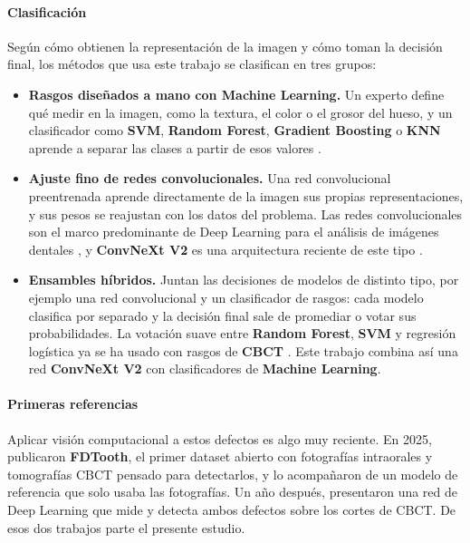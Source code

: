 \documentclass[12pt,a4paper]{article}
\newcommand{\sol}[1]{\textcolor{solucion}{\textbf{#1}}}
\newcommand{\dat}[1]{\textcolor{dataset}{\textbf{#1}}}
\newcommand{\sol}[1]{#1}
\newcommand{\dat}[1]{#1}
\begin{document}
\paragraph{Clasificación}
Según cómo obtienen la representación de la imagen y cómo toman la
decisión final, los métodos que usa este trabajo se clasifican en tres
grupos:
\begin{itemize}
  \item \textbf{Rasgos diseñados a mano con Machine Learning.} Un experto
  define qué medir en la imagen, como la textura, el color o el grosor del
  hueso, y un clasificador como \sol{SVM}, \sol{Random Forest},
  \sol{Gradient Boosting} o \sol{KNN} aprende a separar las clases a
  partir de esos valores \parencite{song2024radiomics,sha2025radiomics}.
  \item \textbf{Ajuste fino de redes convolucionales.} Una red
  convolucional preentrenada aprende directamente de la imagen sus propias
  representaciones, y sus pesos se reajustan con los datos del problema.
  Las redes convolucionales son el marco predominante de Deep Learning
  para el análisis de imágenes dentales \parencite{yuan2026integrating}, y
  \sol{ConvNeXt V2} es una arquitectura reciente de este tipo
  \parencite{woo2023convnextv2}.
  \item \textbf{Ensambles híbridos.} Juntan las decisiones de modelos de
  distinto tipo, por ejemplo una red convolucional y un clasificador de
  rasgos: cada modelo clasifica por separado y la decisión final sale de
  promediar o votar sus probabilidades. La votación suave entre
  \sol{Random Forest}, \sol{SVM} y regresión logística ya se ha usado con
  rasgos de \dat{CBCT} \parencite{sha2025radiomics}. Este trabajo combina
  así una red \sol{ConvNeXt V2} con clasificadores de \sol{Machine
  Learning}.
\end{itemize}

\paragraph{Primeras referencias}
Aplicar visión computacional a estos defectos es algo muy reciente. En
2025, \textcite{liu2025fdtooth} publicaron \dat{FDTooth}, el primer dataset
abierto con fotografías intraorales y tomografías CBCT pensado para
detectarlos, y lo acompañaron de un modelo de referencia que solo usaba
las fotografías. Un año después, \textcite{xu2026swinunetr} presentaron una
red de Deep Learning que mide y detecta ambos defectos sobre los cortes de
CBCT. De esos dos trabajos parte el presente estudio.
\end{document}

